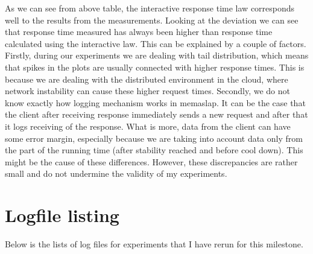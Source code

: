 \documentclass[11pt]{article}
\begin{document}
As we can see from above table, the interactive response time law corresponds well to the results from the measurements. Looking at the deviation we can see that response time measured has always been higher than response time calculated using the interactive law. This can be explained by a couple of factors. Firstly, during our experiments we are dealing with tail distribution, which means that spikes in the plots are usually connected with higher response times. This is because we are dealing with the distributed environment in the cloud, where network instability can cause these higher request times. Secondly, we do not know exactly how logging mechanism works in memaslap. It can be the case that the client after receiving response immediately sends a new request and after that it logs receiving of the response. What is more, data from the client can have some error margin, especially because we are taking into account data only from the part of the running time (after stability reached and before cool down). This might be the cause of these differences. However, these discrepancies are rather small and do not undermine the validity of my experiments.

\pagebreak

\section*{Logfile listing}

Below is the lists of log files for experiments that I have rerun for this milestone.
\medskip
\end{document}
